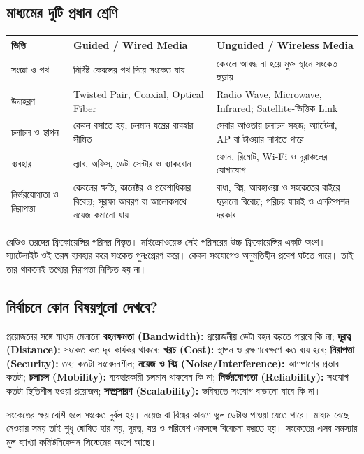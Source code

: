 \subsection{মাধ্যমের দুটি প্রধান শ্রেণি}
\begin{tabularx}{\linewidth}{|p{.18\linewidth}|X|X|}
\hline
\textbf{ভিত্তি} & \textbf{Guided / Wired Media} & \textbf{Unguided / Wireless Media}\\\hline
সংজ্ঞা ও পথ & নির্দিষ্ট কেবলের পথ দিয়ে সংকেত যায় & কেবলে আবদ্ধ না হয়ে মুক্ত স্থানে সংকেত ছড়ায়\\\hline
উদাহরণ & Twisted Pair, Coaxial, Optical Fiber & Radio Wave, Microwave, Infrared; Satellite-ভিত্তিক Link\\\hline
চলাচল ও স্থাপন & কেবল বসাতে হয়; চলমান যন্ত্রের ব্যবহার সীমিত & সেবার আওতায় চলাচল সহজ; অ্যান্টেনা, AP বা টাওয়ার লাগতে পারে\\\hline
ব্যবহার & ল্যাব, অফিস, ডেটা সেন্টার ও ব্যাকবোন & ফোন, রিমোট, Wi-Fi ও দূরাঞ্চলের যোগাযোগ\\\hline
নির্ভরযোগ্যতা ও নিরাপত্তা & কেবলের ক্ষতি, কানেক্টর ও প্রবেশাধিকার বিবেচ্য; সুরক্ষা আবরণ বা আলোকপথে নয়েজ কমানো যায় & বাধা, বিঘ্ন, আবহাওয়া ও সংকেতের বাইরে ছড়ানো বিবেচ্য; পরিচয় যাচাই ও এনক্রিপশন দরকার\\\hline
\end{tabularx}
রেডিও তরঙ্গের ফ্রিকোয়েন্সির পরিসর বিস্তৃত। মাইক্রোওয়েভ সেই পরিসরের উচ্চ ফ্রিকোয়েন্সির একটি অংশ। স্যাটেলাইট ওই তরঙ্গ ব্যবহার করে সংকেত পুনঃপ্রেরণ করে। কেবল সংযোগেও অনুমতিহীন প্রবেশ ঘটতে পারে। তাই তার থাকলেই তথ্যের নিরাপত্তা নিশ্চিত হয় না।
\subsection{নির্বাচনে কোন বিষয়গুলো দেখবে?}
\begin{keypointbox}{প্রয়োজনের সঙ্গে মাধ্যম মেলানো}
\textbf{বহনক্ষমতা (Bandwidth):} প্রয়োজনীয় ডেটা বহন করতে পারবে কি না; \textbf{দূরত্ব (Distance):} সংকেত কত দূর কার্যকর থাকবে; \textbf{খরচ (Cost):} স্থাপন ও রক্ষণাবেক্ষণে কত ব্যয় হবে; \textbf{নিরাপত্তা (Security):} তথ্য কতটা সংবেদনশীল; \textbf{নয়েজ ও বিঘ্ন (Noise/Interference):} আশপাশের প্রভাব কতটা; \textbf{চলাচল (Mobility):} ব্যবহারকারী চলমান থাকবেন কি না; \textbf{নির্ভরযোগ্যতা (Reliability):} সংযোগ কতটা স্থিতিশীল হওয়া প্রয়োজন; \textbf{সম্প্রসারণ (Scalability):} ভবিষ্যতে সংযোগ বাড়ানো যাবে কি না।
\end{keypointbox}
সংকেতের ক্ষয় বেশি হলে সংকেত দুর্বল হয়। নয়েজ বা বিঘ্নের কারণে ভুল ডেটাও পাওয়া যেতে পারে। মাধ্যম বেছে নেওয়ার সময় তাই শুধু ঘোষিত হার নয়, দূরত্ব, যন্ত্র ও পরিবেশ একসঙ্গে বিবেচনা করতে হয়। সংকেতের এসব সমস্যার মূল ব্যাখ্যা কমিউনিকেশন সিস্টেমের অংশে আছে।


